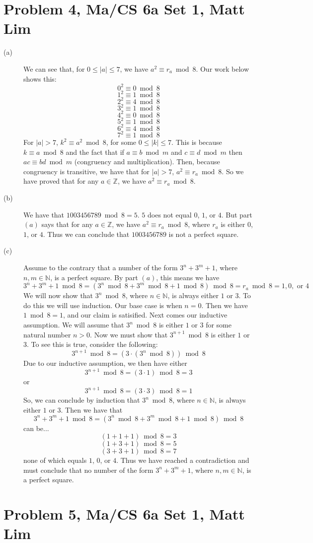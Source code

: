 \documentclass{article}
\begin{document}
\section*{Problem 4, Ma/CS 6a Set 1, Matt Lim}
\begin{description}
    \item[(a)] We can see that, for $0 \leq |a| \leq 7$, we have $a^2
        \equiv r_a \bmod 8$. Our work below shows this:
        \[ 0^2 \equiv 0 \bmod 8 \]
        \[ 1^2 \equiv 1 \bmod 8 \]
        \[ 2^2 \equiv 4 \bmod 8 \]
        \[ 3^2 \equiv 1 \bmod 8 \]
        \[ 4^2 \equiv 0 \bmod 8 \]
        \[ 5^2 \equiv 1 \bmod 8 \]
        \[ 6^2 \equiv 4 \bmod 8 \]
        \[ 7^2 \equiv 1 \bmod 8 \]
        For $|a| > 7$, $k^2 \equiv a^2 \bmod 8$, for some $0 \leq |k| \leq 7$.
        This is because $k \equiv a \bmod 8$ and the fact that if $a \equiv b \bmod
        m$ and $c \equiv d \bmod m$ then $ac \equiv bd \bmod m$ (congruency and
        multiplication). Then, because congruency is transitive, we have
        that for $|a| > 7$, $a^2 \equiv r_a \bmod 8$. So we have proved
        that for any $a \in \mathbb{Z}$, we have $a^2 \equiv r_a \bmod 8$.
    \item[(b)] We have that $1003456789 \bmod 8 = 5$. $5$ does not equal
        $0$, $1$, or $4$. But part $(a)$ says that for any $a \in \mathbb{Z}$,
        we have $a^2 \equiv r_a \bmod 8$, where $r_a$ is either $0$, $1$, or $4$.
        Thus we can conclude that $1003456789$ is not a perfect square.
    \item[(c)] Assume to the contrary that a number of the form
        $3^n + 3^m + 1$, where $n,m \in \mathbb{N}$, is a perfect square.
        By part $(a)$, this means we have
        \[3^n + 3^m + 1 \bmod 8 = (3^n \bmod 8 + 3^m \bmod 8 + 1 \bmod 8) \bmod 8
        = r_a \bmod 8  = 1,0, \text{ or }4\]
        We will now show that $3^n \bmod 8$, where $n \in \mathbb{N}$, is
        always either $1$ or $3$. To do this we will use induction. Our
        base case is when $n=0$. Then we have $1 \bmod 8 = 1$, and our
        claim is satisified. Next comes our inductive assumption. We will
        assume that $3^n \bmod 8$ is either $1$ or $3$ for some natural number
        $n > 0$. Now we must show that $3^{n+1} \bmod 8$ is either $1$ or $3$.
        To see this is true, consider the following:
        \[ 3^{n+1} \bmod 8 = (3 \cdot (3^n \bmod 8)) \bmod 8 \]
        Due to our inductive assumption, we then have either
        \[ 3^{n+1} \bmod 8 = (3 \cdot 1) \bmod 8 = 3 \]
        or
        \[ 3^{n+1} \bmod 8 = (3 \cdot 3) \bmod 8 = 1 \]
        So, we can conclude by induction that $3^n \bmod 8$, where $n \in
        \mathbb{N}$, is always either $1$ or $3$.
        Then we have that
        \[3^n + 3^m + 1 \bmod 8 = (3^n \bmod 8 + 3^m \bmod 8 + 1 \bmod 8) \bmod 8 \]
        can be...
        \[ (1+1+1) \bmod 8 = 3 \]
        \[ (1+3+1) \bmod 8 = 5 \]
        \[ (3+3+1) \bmod 8 = 7 \]
        none of which equals $1$, $0$, or $4$. Thus we have reached a contradiction
        and must conclude that no number of the form $3^n + 3^m + 1$, where
        $n,m \in \mathbb{N}$, is a perfect square.
\end{description}
\newpage
\section*{Problem 5, Ma/CS 6a Set 1, Matt Lim}
\newpage
\end{document}
